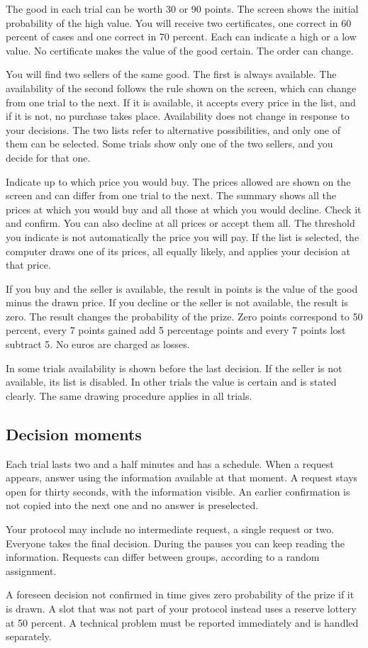 \documentclass[11pt,a4paper]{article}
\begin{document}
{\small
The good in each trial can be worth 30 or 90 points. The screen shows the initial probability of the high value. You will receive two certificates, one correct in 60 percent of cases and one correct in 70 percent. Each can indicate a high or a low value. No certificate makes the value of the good certain. The order can change.

You will find two sellers of the same good. The first is always available. The availability of the second follows the rule shown on the screen, which can change from one trial to the next. If it is available, it accepts every price in the list, and if it is not, no purchase takes place. Availability does not change in response to your decisions. The two lists refer to alternative possibilities, and only one of them can be selected. Some trials show only one of the two sellers, and you decide for that one.

Indicate up to which price you would buy. The prices allowed are shown on the screen and can differ from one trial to the next. The summary shows all the prices at which you would buy and all those at which you would decline. Check it and confirm. You can also decline at all prices or accept them all. The threshold you indicate is not automatically the price you will pay. If the list is selected, the computer draws one of its prices, all equally likely, and applies your decision at that price.

If you buy and the seller is available, the result in points is the value of the good minus the drawn price. If you decline or the seller is not available, the result is zero. The result changes the probability of the prize. Zero points correspond to 50 percent, every 7 points gained add 5 percentage points and every 7 points lost subtract 5. No euros are charged as losses.

In some trials availability is shown before the last decision. If the seller is not available, its list is disabled. In other trials the value is certain and is stated clearly. The same drawing procedure applies in all trials.

}

\subsection{Decision moments}

{\small
Each trial lasts two and a half minutes and has a schedule. When a request appears, answer using the information available at that moment. A request stays open for thirty seconds, with the information visible. An earlier confirmation is not copied into the next one and no answer is preselected.

Your protocol may include no intermediate request, a single request or two. Everyone takes the final decision. During the pauses you can keep reading the information. Requests can differ between groups, according to a random assignment.

A foreseen decision not confirmed in time gives zero probability of the prize if it is drawn. A slot that was not part of your protocol instead uses a reserve lottery at 50 percent. A technical problem must be reported immediately and is handled separately.

}
\end{document}

